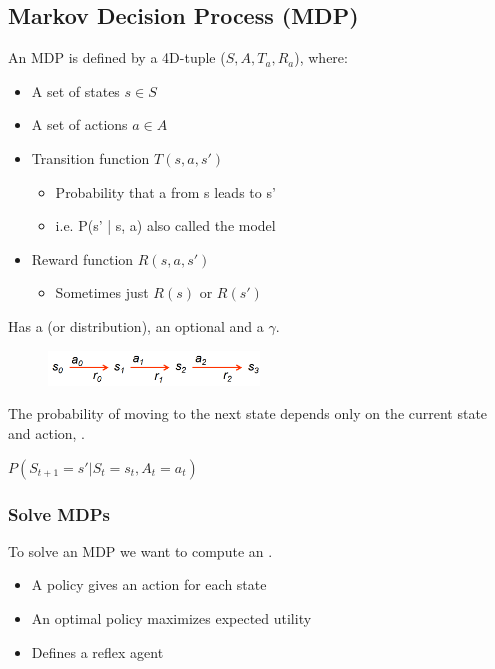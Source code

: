 \documentclass[
../../EiKI_Summary.tex,
]
{subfiles}
\begin{document}
\subsection{Markov Decision Process (MDP)}
An MDP is defined by a 4D-tuple ($S,A,T_a,R_a$), where:
\begin{itemize}
    \item {} A set of states $s \in S$
    \item {} A set of actions $a \in A$
    \item {} Transition function $T(s,a,s')$
    \begin{itemize}
        \item Probability that a from s leads to s'
        \item i.e. P(s' | s, a) also called the model 
    \end{itemize}
    \item {} Reward function $R(s,a,s')$
    \begin{itemize}
        \item Sometimes just $R(s)$ or $R(s')$
    \end{itemize}
\end{itemize}

Has a  (or distribution), an optional  and a  $\gamma$.

\begin{figure}
    [H]
    \centering
    \includegraphics[width = 0.5\textwidth]{Pics/12/MarkovDecisionProcessEx.png}
\end{figure}

\begin{defbox}
    The probability of moving to the next state depends only on the current state and action, .

    \begin{csmb*}
        $P(S_{t+1} = s'|S_t = s_t, A_t = a_t)$
    \end{csmb*}

\end{defbox}

\subsubsection{Solve MDPs}
To solve an MDP we want to compute an .
\begin{itemize}
    \item A policy gives an action for each state
    \item An optimal policy maximizes expected utility
    \item Defines a reflex agent
\end{itemize}
\end{document}
